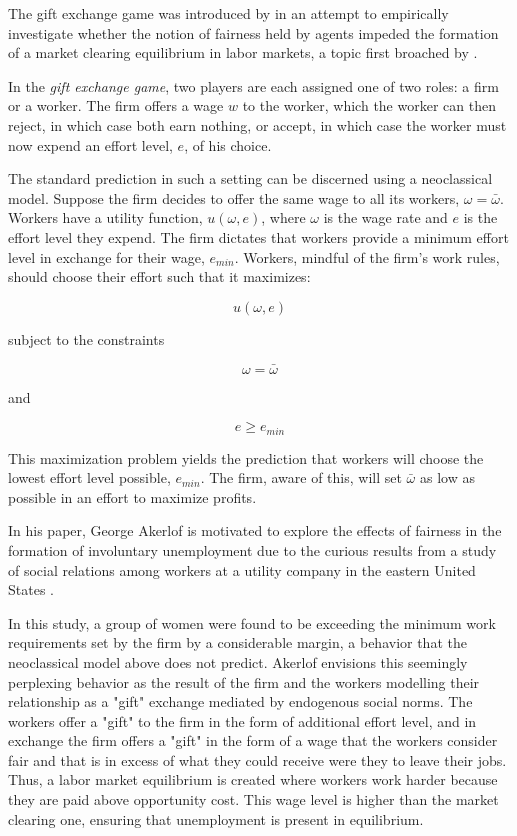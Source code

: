 \documentclass[12pt]{article}
\begin{document}
The gift exchange game was introduced by \cite{fehr1993} in an attempt to empirically investigate whether the notion of fairness held by agents impeded the formation of a market clearing equilibrium in labor markets, a topic first broached by \cite{akerlof1982}. 

In the \textit{gift exchange game}, two players are each assigned one of two roles: a firm or a worker. The firm offers a wage $w$ to the worker, which the worker can then reject, in which case both earn nothing, or accept, in which case the worker must now expend an effort level, $e$, of his choice. 

The standard prediction in such a setting can be discerned using a neoclassical model. Suppose the firm decides to offer the same wage to all its workers, $\omega = \bar{\omega}$. Workers have a utility function, $u(\omega,e)$, where $\omega$ is the wage rate and $e$ is the effort level they expend. The firm dictates that workers provide a minimum effort level in exchange for their wage, $e_{min}$. Workers, mindful of the firm's work rules, should choose their effort such that it maximizes:

\begin{equation}
u(\omega,e)
\end{equation}

subject to the constraints

\begin{equation}
\omega = \bar{\omega}
\end{equation}

and


\begin{equation}
e \geq e_{min}
\end{equation}


This maximization problem yields the prediction that workers will choose the lowest effort level possible, $e_{min}$. The firm, aware of this, will set $\bar{\omega}$ as low as possible in an effort to maximize profits. 

In his paper, George Akerlof is motivated to explore the effects of fairness in the formation of involuntary unemployment due to the curious results from a study of social relations among workers at a utility company in the eastern United States \citep{homans1954cash}. 

In this study, a group of women were found to be exceeding the minimum work requirements set by the firm by a considerable margin, a behavior that the neoclassical model above does not predict. Akerlof envisions this seemingly perplexing behavior as the result of the firm and the workers modelling their relationship as a "gift" exchange mediated by endogenous social norms. The workers offer a "gift" to the firm in the form of additional effort level, and in exchange the firm offers a "gift" in the form of a wage that the workers consider fair and that is in excess of what they could receive were they to leave their jobs. Thus, a labor market equilibrium is created where workers work harder because they are paid above opportunity cost. This wage level is higher than the market clearing one, ensuring that unemployment is present in equilibrium.
\end{document}
